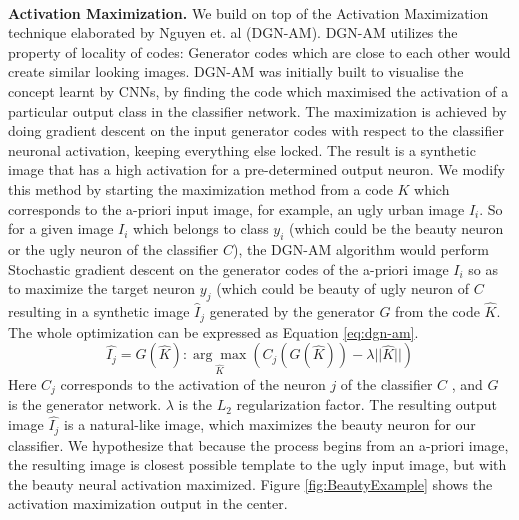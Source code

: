 \mbox{} \\
\noindent
\textbf{Activation Maximization.}
We build on top of the Activation Maximization technique elaborated by Nguyen et. al \cite{nguyen2016synthesizing} (DGN-AM). DGN-AM utilizes the property of locality of codes:%
Generator codes which are close to each other would create similar looking images. DGN-AM was initially built to visualise the concept learnt by CNNs, by finding the code which maximised the activation of a particular output class in the classifier network. %
The maximization is achieved by doing gradient descent on the input generator codes with respect to the classifier neuronal activation, keeping everything else locked. The result is a synthetic image that has a high activation for a pre-determined output neuron.
We modify this method by starting the maximization method from a code $K$ which corresponds to the a-priori input image, for example, an ugly urban image $I_i$. So for a given image $I_i$ which belongs to class $y_i$ (which could be the beauty neuron or the ugly neuron of the classifier $C$), the DGN-AM algorithm would perform Stochastic gradient descent on the generator codes of the a-priori image $I_i$ so as to maximize the target neuron $y_j$ (which could be beauty of ugly neuron of $C$ resulting in a synthetic image $\hat{I}_j$ generated by the generator $G$ from the code $ \hat{K} $. The whole optimization can be expressed as Equation \ref{eq:dgn-am}.
 \begin{equation}
  \hat{I_j}=G( \hat{K} ) : \underset{\hat{K}}{\arg\max}(C_j(G(\hat{K}))-\lambda||\hat{K}||)
  \label{eq:dgn-am}
 \end{equation}
Here $C_j$ corresponds to the activation of the neuron $j$ of the classifier $C$ , and $G$ is the generator network. $\lambda$ is the $L_2$ regularization factor.
The resulting output image $\hat{I_j}$ is a natural-like image, which maximizes the beauty neuron for our classifier. We hypothesize that because the process begins from an a-priori image, the resulting image is closest possible template to the ugly input image, but with the beauty neural activation maximized. Figure \ref{fig:BeautyExample} shows the activation maximization output in the center.
